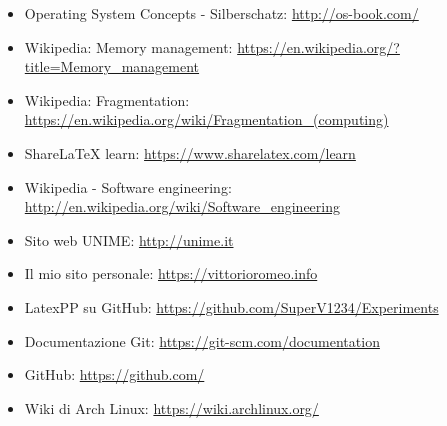 \documentclass[12pt]{report}
\begin{document}
            \begin{itemize}
                \item Operating System Concepts - Silberschatz: \url{http://os-book.com/}
                \item Wikipedia: Memory management: \url{https://en.wikipedia.org/?title=Memory_management}
                \item Wikipedia: Fragmentation: \url{https://en.wikipedia.org/wiki/Fragmentation_(computing)}
                \item ShareLaTeX learn: \url{https://www.sharelatex.com/learn}
                \item Wikipedia - Software engineering: \url{http://en.wikipedia.org/wiki/Software_engineering}
                \item Sito web UNIME: \url{http://unime.it}
                \item Il mio sito personale: \url{https://vittorioromeo.info}
                \item LatexPP su GitHub: \url{https://github.com/SuperV1234/Experiments}
                \item Documentazione Git: \url{https://git-scm.com/documentation}            
                \item GitHub: \url{https://github.com/}
                \item Wiki di Arch Linux: \url{https://wiki.archlinux.org/}
            \end{itemize}
\end{document}
